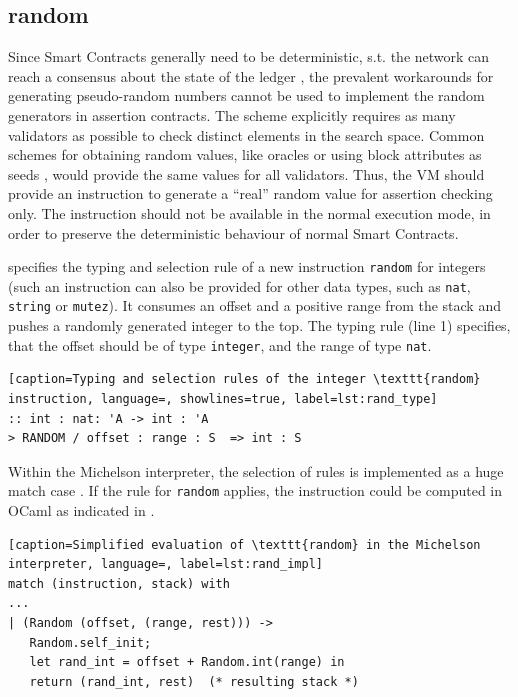 \subsection{random}\label{sec:random}
Since Smart Contracts generally need to be deterministic, s.t. the network can reach a consensus about the state of the ledger \cite{chatterjee_probabilistic_2019}, the prevalent workarounds for generating pseudo-random numbers cannot be used to implement the random generators in assertion contracts. The scheme explicitly requires as many validators as possible to check distinct elements in the search space. Common schemes for obtaining random values, like oracles or using block attributes as seeds \cite{chatterjee_probabilistic_2019}, would provide the same values for all validators. Thus, the VM should provide an instruction to generate a ``real'' random value for assertion checking only. The instruction should not be available in the normal execution mode, in order to preserve the deterministic behaviour of normal Smart Contracts.

 specifies the typing and selection rule of a new instruction \texttt{random} for integers (such an instruction can also be provided for other data types, such as \texttt{nat}, \texttt{string} or \texttt{mutez}). It consumes an offset and a positive range from the stack and pushes a randomly generated integer to the top. The typing rule (line 1) specifies, that the offset should be of type \texttt{integer}, and the range of type \texttt{nat}.
\lstset{upquote=true}
\begin{lstlisting}[caption=Typing and selection rules of the integer \texttt{random} instruction, language=, showlines=true, label=lst:rand_type]
:: int : nat: 'A -> int : 'A
> RANDOM / offset : range : S  => int : S
\end{lstlisting}

Within the Michelson interpreter, the selection of rules is implemented as a huge match case \cite{tezos_repo}. If the rule for \texttt{random} applies, the instruction could be computed in OCaml as indicated in .
\begin{lstlisting}[caption=Simplified evaluation of \texttt{random} in the Michelson interpreter, language=, label=lst:rand_impl]
match (instruction, stack) with
...
| (Random (offset, (range, rest))) ->
   Random.self_init;
   let rand_int = offset + Random.int(range) in
   return (rand_int, rest)  (* resulting stack *)
\end{lstlisting}

